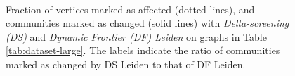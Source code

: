 \begin{figure}[hbtp]
  \centering
   \\[-4ex]
  \caption{Fraction of vertices marked as affected (dotted lines), and communities marked as changed (solid lines) with \textit{Delta-screening (DS)} and \textit{Dynamic Frontier (DF) Leiden} on graphs in Table \ref{tab:dataset-large}. The labels indicate the ratio of communities marked as changed by DS Leiden to that of DF Leiden.}
  \label{fig:8020-affected}
\end{figure}
